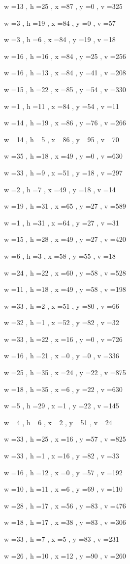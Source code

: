 \documentclass[11pt]{article}
\begin{document}
w =13 , h =25 , x =87 , y =0 , v =325
\par
w =3 , h =19 , x =84 , y =0 , v =57
\par
w =3 , h =6 , x =84 , y =19 , v =18
\par
w =16 , h =16 , x =84 , y =25 , v =256
\par
w =16 , h =13 , x =84 , y =41 , v =208
\par
w =15 , h =22 , x =85 , y =54 , v =330
\par
w =1 , h =11 , x =84 , y =54 , v =11
\par
w =14 , h =19 , x =86 , y =76 , v =266
\par
w =14 , h =5 , x =86 , y =95 , v =70
\par
w =35 , h =18 , x =49 , y =0 , v =630
\par
w =33 , h =9 , x =51 , y =18 , v =297
\par
w =2 , h =7 , x =49 , y =18 , v =14
\par
w =19 , h =31 , x =65 , y =27 , v =589
\par
w =1 , h =31 , x =64 , y =27 , v =31
\par
w =15 , h =28 , x =49 , y =27 , v =420
\par
w =6 , h =3 , x =58 , y =55 , v =18
\par
w =24 , h =22 , x =60 , y =58 , v =528
\par
w =11 , h =18 , x =49 , y =58 , v =198
\par
w =33 , h =2 , x =51 , y =80 , v =66
\par
w =32 , h =1 , x =52 , y =82 , v =32
\par
w =33 , h =22 , x =16 , y =0 , v =726
\par
w =16 , h =21 , x =0 , y =0 , v =336
\par
w =25 , h =35 , x =24 , y =22 , v =875
\par
w =18 , h =35 , x =6 , y =22 , v =630
\par
w =5 , h =29 , x =1 , y =22 , v =145
\par
w =4 , h =6 , x =2 , y =51 , v =24
\par
w =33 , h =25 , x =16 , y =57 , v =825
\par
w =33 , h =1 , x =16 , y =82 , v =33
\par
w =16 , h =12 , x =0 , y =57 , v =192
\par
w =10 , h =11 , x =6 , y =69 , v =110
\par
w =28 , h =17 , x =56 , y =83 , v =476
\par
w =18 , h =17 , x =38 , y =83 , v =306
\par
w =33 , h =7 , x =5 , y =83 , v =231
\par
w =26 , h =10 , x =12 , y =90 , v =260
\par
\newpage
\end{document}
